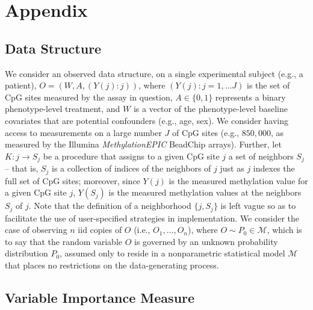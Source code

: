 \documentclass[9pt,a4paper,]{extarticle}
\theoremstyle{definition}
\theoremstyle{definition}
\theoremstyle{definition}
\theoremstyle{remark}
\begin{document}
\hypertarget{appendix}{%
\section{Appendix}\label{appendix}}

\hypertarget{data-structure}{%
\subsection{Data Structure}\label{data-structure}}

We consider an observed data structure, on a single experimental subject (e.g.,
a patient), \(O = (W, A, (Y(j) : j))\), where \((Y(j) : j = 1, \ldots J)\) is the
set of CpG sites measured by the assay in question, \(A \in \{0, 1\}\) represents
a binary phenotype-level treatment, and \(W\) is a vector of the phenotype-level
baseline covariates that are potential confounders (e.g., age, sex). We consider
having access to measurements on a large number \(J\) of CpG sites (e.g.,
\(850,000\), as measured by the Illumina \emph{MethylationEPIC} BeadChip arrays).
Further, let \(K: j \to S_j\) be a procedure that assigns to a given CpG site \(j\)
a set of neighbors \(S_j\) -- that is, \(S_j\) is a collection of indices of the
neighbors of \(j\) just as \(j\) indexes the full set of CpG sites; moreover, since
\(Y(j)\) is the measured methylation value for a given CpG site \(j\), \(Y(S_j)\) is
the measured methylation values at the neighbors \(S_j\) of \(j\). Note that the
definition of a neighborhood \(\{j, S_j\}\) is left vague so as to facilitate the
use of user-specified strategies in implementation. We consider the case of
observing \(n\) iid copies of \(O\) (i.e., \(O_1, \ldots, O_n\)), where \(O \sim P_0 \in \mathcal{M}\), which is to say that the random variable \(O\) is governed by an
unknown probability distribution \(P_0\), assumed only to reside in a
nonparametric statistical model \(\mathcal{M}\) that places no restrictions on the
data-generating process.

\hypertarget{variable-importance-measure}{%
\subsection{Variable Importance Measure}\label{variable-importance-measure}}
\end{document}
